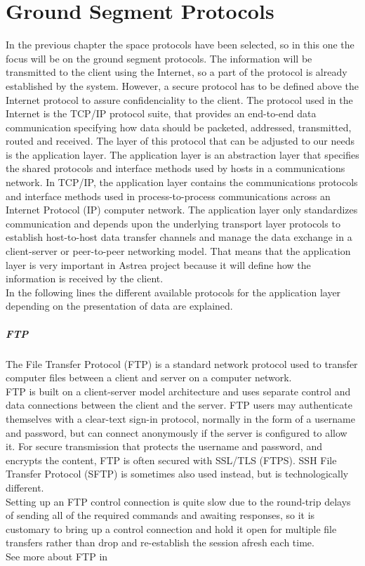 \chapter{Ground Segment Protocols}

In the previous chapter the space protocols have been selected, so in this one the focus will be on the ground segment protocols. The information will be transmitted to the client using the Internet, so a part of the protocol is already established by the system. However, a secure protocol has to be defined above the Internet protocol to assure confidenciality to the client. The protocol used in the Internet is the TCP/IP protocol suite, that provides an end-to-end data communication specifying how data should be packeted, addressed, transmitted, routed and received. The layer of this protocol that can be adjusted to our needs is the application layer. The application layer is an abstraction layer that specifies the shared protocols and interface methods used by hosts in a communications network. In TCP/IP, the application layer contains the communications protocols and interface methods used in process-to-process communications across an Internet Protocol (IP) computer network. The application layer only standardizes communication and depends upon the underlying transport layer protocols to establish host-to-host data transfer channels and manage the data exchange in a client-server or peer-to-peer networking model. That means that the application layer is very important in Astrea project because it will define how the information is received by the client.\\
In the following lines the different available protocols for the application layer depending on the presentation of data are explained.\\

\paragraph{FTP} 
The File Transfer Protocol (FTP) is a standard network protocol used to transfer computer files between a client and server on a computer network.\\
FTP is built on a client-server model architecture and uses separate control and data connections between the client and the server. FTP users may authenticate themselves with a clear-text sign-in protocol, normally in the form of a username and password, but can connect anonymously if the server is configured to allow it. For secure transmission that protects the username and password, and encrypts the content, FTP is often secured with SSL/TLS (FTPS). SSH File Transfer Protocol (SFTP) is sometimes also used instead, but is technologically different.\\
Setting up an FTP control connection is quite slow due to the round-trip delays of sending all of the required commands and awaiting responses, so it is customary to bring up a control connection and hold it open for multiple file transfers rather than drop and re-establish the session afresh each time. \\
See more about FTP in \cite{FTP}
